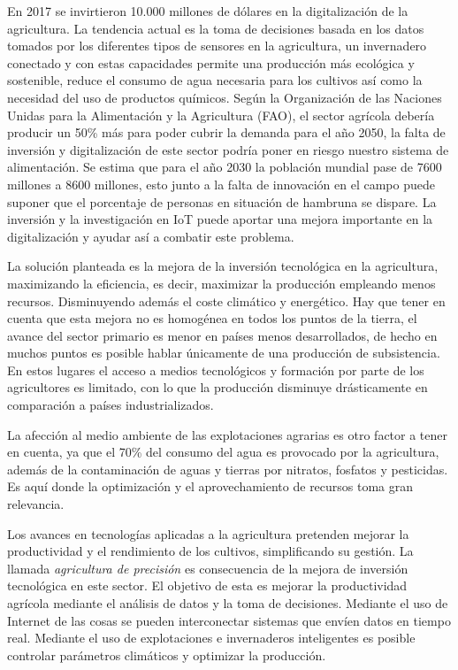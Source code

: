 \documentclass[a4paper, 12pt, oneside]{book}
\begin{document}
En 2017 se invirtieron 10.000 millones de dólares en la digitalización de la agricultura. La tendencia actual es la toma de decisiones basada en los datos tomados por los diferentes tipos de sensores en la agricultura, un invernadero conectado y con estas capacidades permite una producción más ecológica y sostenible, reduce el consumo de agua necesaria para los cultivos así como la necesidad del uso de productos químicos.
Según la Organización de las Naciones Unidas para la Alimentación y la Agricultura (FAO), el sector agrícola debería producir un 50\% más para poder cubrir la demanda para el año 2050, la falta de inversión y digitalización de este sector podría poner en riesgo nuestro sistema de alimentación. Se estima que para el año 2030 la población mundial pase de 7600 millones a 8600 millones, esto junto a la falta de innovación en el campo puede suponer que el porcentaje de personas en situación de hambruna se dispare. La inversión y la investigación en IoT puede aportar una mejora importante en la digitalización y ayudar así a combatir este problema.

La solución planteada es la mejora de la inversión tecnológica en la agricultura, maximizando la eficiencia, es decir, maximizar la producción empleando menos recursos. Disminuyendo además el coste climático y energético. Hay que tener en cuenta que esta mejora no es homogénea en todos los puntos de la tierra, el avance del sector primario es menor en países menos desarrollados, de hecho en muchos puntos es posible hablar únicamente de una producción de subsistencia. En estos lugares el acceso a medios tecnológicos y formación por parte de los agricultores es limitado, con lo que la producción disminuye drásticamente en comparación a países industrializados.

La afección al medio ambiente de las explotaciones agrarias es otro factor a tener en cuenta, ya que el 70\% del consumo del agua es provocado por la agricultura, además de la contaminación de aguas y tierras por nitratos, fosfatos y pesticidas. Es aquí donde la optimización y el aprovechamiento de recursos toma gran relevancia.

Los avances en tecnologías aplicadas a la agricultura pretenden mejorar la productividad y el rendimiento de los cultivos, simplificando su gestión. La llamada \textit{agricultura de precisión} es consecuencia de la mejora de inversión tecnológica en este sector. El objetivo de esta es mejorar la productividad agrícola mediante el análisis de datos y la toma de decisiones. Mediante el uso de Internet de las cosas se pueden interconectar sistemas que envíen datos en tiempo real. Mediante el uso de explotaciones e invernaderos inteligentes es posible controlar parámetros climáticos y optimizar la producción.
\end{document}
